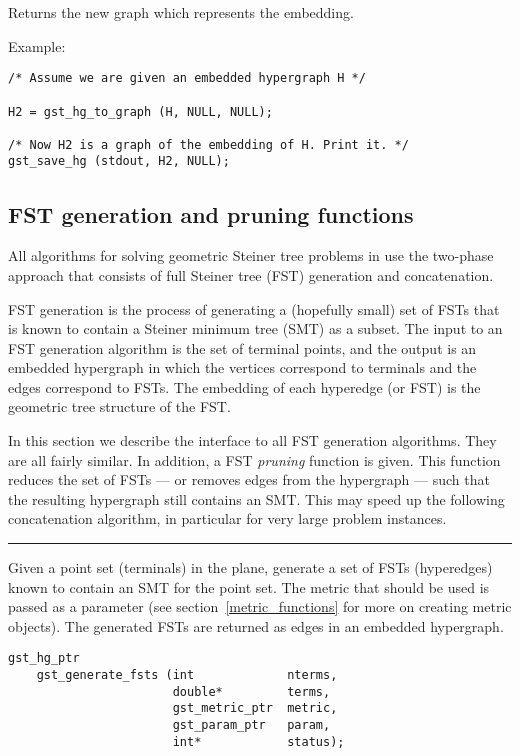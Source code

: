 Returns the new graph which represents the embedding.

\bigskip{}Example:
{\footnotesize
\begin{verbatim}
/* Assume we are given an embedded hypergraph H */

H2 = gst_hg_to_graph (H, NULL, NULL);

/* Now H2 is a graph of the embedding of H. Print it. */
gst_save_hg (stdout, H2, NULL);
\end{verbatim}
}
\clearpage\subsection{FST generation and pruning functions}
\label{fst_functions}

All algorithms for solving geometric Steiner tree problems in
\geosteiner{} use the two-phase approach that consists of full Steiner
tree (FST) generation and concatenation.

FST generation is the process of generating a (hopefully small) set
of FSTs that is known to contain a Steiner minimum tree (SMT) as a
subset. The input to an FST generation algorithm is the set of
terminal points, and the output is an embedded hypergraph in which the
vertices correspond to terminals and the edges correspond to FSTs. The
embedding of each hyperedge (or FST) is the geometric tree structure
of the FST.  

In this section we describe the interface to all FST generation
algorithms. They are all fairly similar. In addition, a FST {\em
pruning} function is given. This function reduces the set of FSTs ---
or removes edges from the hypergraph --- such that the resulting
hypergraph still contains an SMT. This may speed up the following
concatenation algorithm, in particular for very large problem
instances. 

\clearpage{}
\label{gst_generate_fsts}

\hrule
\vskip 0.25in
Given a point set (terminals) in the plane, generate a set of FSTs
(hyperedges) known to contain an SMT for the point set. The metric
that should be used is passed as a parameter (see
section~\ref{metric_functions} for more on creating metric objects). 
The generated FSTs are returned as edges in an embedded hypergraph.  

\begin{verbatim}
gst_hg_ptr 
    gst_generate_fsts (int             nterms,
                       double*         terms,
                       gst_metric_ptr  metric,
                       gst_param_ptr   param,
                       int*            status);

\end{verbatim}

